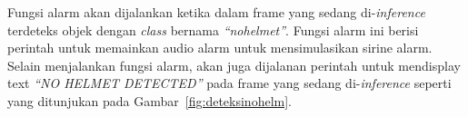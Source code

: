 

\par Fungsi alarm akan dijalankan ketika dalam frame yang sedang di-\emph{inference} terdeteks objek 
dengan \emph{class} bernama \emph{“no\textunderscore helmet”}. Fungsi alarm ini berisi perintah untuk 
memainkan audio alarm untuk mensimulasikan sirine alarm. Selain menjalankan fungsi alarm, akan juga 
dijalanan perintah untuk mendisplay text \emph{“NO HELMET DETECTED”} pada frame yang sedang 
di-\emph{inference} seperti yang ditunjukan pada Gambar~\ref{fig:deteksinohelm}.

